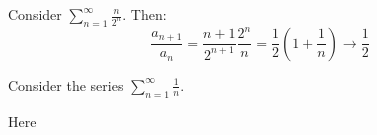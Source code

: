 \documentclass[../Main.tex]{subfiles}
\begin{document}
\begin{example}
    Consider $\sum_{n=1}^{\infty} \frac{n}{2^n}$. Then:
    \begin{equation*}
        \frac{a_{n+1}}{a_n} = \frac{n+1}{2^{n+1}} \frac{2^n}{n} = \frac{1}{2} \left(1 + \frac{1}{n}\right) \to \frac{1}{2}
    \end{equation*}
\end{example}
\begin{example}
    Consider the series $\sum_{n=1}^\infty \frac{1}{n}$.\par
    Here %
    \label{exRootAndRatioFail}
\end{example}
\end{document}
